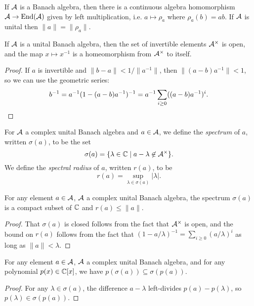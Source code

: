 \begin{prop} If $\mathcal{A}$ is a Banach algebra, then there is a continuous algebra homomorphism $\mathcal{A} \rightarrow \operatorname{End}(\mathcal{A})$ given by left multiplication, i.e. $a \mapsto \rho_a$ where $\rho_a(b) = ab$. If $\mathcal{A}$ is unital then $\|a\| = \|\rho_a\|$.
\end{prop}

\begin{prop} If $\mathcal{A}$ is a unital Banach algebra, then the set of invertible elements $\mathcal{A}^\times$ is open, and the map $x \mapsto x^{-1}$ is a homeomorphism from $\mathcal{A}^\times$ to itself.
\end{prop}
\begin{proof} If $a$ is invertible and $\|b - a\| < 1/\|a^{-1}\|$, then $\|(a-b)a^{-1}\| < 1$, so we can use the geometric series:
\[
b^{-1} = a^{-1}(1 - (a-b)a^{-1})^{-1} = a^{-1} \sum_{i \ge 0} ((a-b)a^{-1})^i.\qedhere
\]
\end{proof}

\begin{defn} For $\mathcal{A}$ a complex unital Banach algebra and $a \in \mathcal{A}$, we define the \emph{spectrum} of $a$, written $\sigma(a)$, to be the set
\[
\sigma(a) = \{\lambda \in \mathbb{C} \mid a - \lambda \not\in \mathcal{A}^\times\}.
\]
We define the \emph{spectral radius} of $a$, written $r(a)$, to be
\[
r(a) = \sup_{\lambda \in \sigma(a)} |\lambda|.
\]
\end{defn}

\begin{prop} For any element $a \in \mathcal{A}$, $\mathcal{A}$ a complex unital Banach algebra, the spectrum $\sigma(a)$ is a compact subset of $\mathbb{C}$ and $r(a) \le \|a\|$.
\end{prop}
\begin{proof} That $\sigma(a)$ is closed follows from the fact that $\mathcal{A}^\times$ is open, and the bound on $r(a)$ follows from the fact that $(1 - a/\lambda)^{-1} = \sum_{i \ge 0} (a/\lambda)^i$ as long as $\|a\| < \lambda$.
\end{proof}

\begin{prop} For any element $a \in \mathcal{A}$, $\mathcal{A}$ a complex unital Banach algebra, and for any polynomial $p(x) \in \mathbb{C}[x]$, we have $p(\sigma(a)) \subseteq \sigma(p(a))$.
\end{prop}
\begin{proof} For any $\lambda \in \sigma(a)$, the difference $a-\lambda$ left-divides $p(a) - p(\lambda)$, so $p(\lambda) \in \sigma(p(a))$.
\end{proof}

